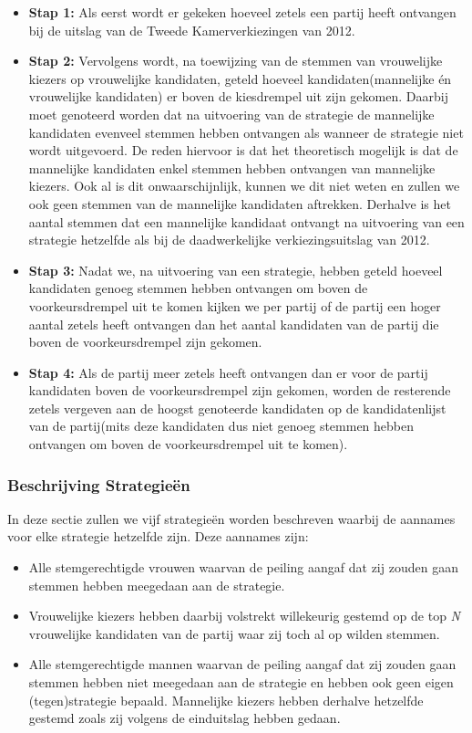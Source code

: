 \begin{itemize}
	\item
\textbf{Stap 1:} Als eerst wordt er gekeken hoeveel zetels een partij heeft ontvangen bij de uitslag van de Tweede Kamerverkiezingen van 2012. 
	\item
\textbf{Stap 2:} Vervolgens wordt, na toewijzing van de stemmen van vrouwelijke kiezers op vrouwelijke kandidaten, geteld hoeveel kandidaten(mannelijke én vrouwelijke kandidaten) er boven de kiesdrempel uit zijn gekomen. Daarbij moet genoteerd worden dat na uitvoering van de strategie de mannelijke kandidaten evenveel stemmen hebben ontvangen als wanneer de strategie niet wordt uitgevoerd. De reden hiervoor is dat het theoretisch mogelijk is dat de mannelijke kandidaten enkel stemmen hebben ontvangen van mannelijke kiezers. Ook al is dit onwaarschijnlijk, kunnen we dit niet weten en zullen we ook geen stemmen van de mannelijke kandidaten aftrekken. Derhalve is het aantal stemmen dat een mannelijke kandidaat ontvangt na uitvoering van een strategie hetzelfde als bij de daadwerkelijke verkiezingsuitslag van 2012.
	\item
\textbf{Stap 3:} Nadat we, na uitvoering van een strategie, hebben geteld hoeveel kandidaten genoeg stemmen hebben ontvangen om boven de voorkeursdrempel uit te komen kijken we per partij of de partij een hoger aantal zetels heeft ontvangen dan het aantal kandidaten van de partij die boven de voorkeursdrempel zijn gekomen. 
	\item
\textbf{Stap 4:} Als de partij meer zetels heeft ontvangen dan er voor de partij kandidaten boven de voorkeursdrempel zijn gekomen, worden de resterende zetels vergeven aan de hoogst genoteerde kandidaten op de kandidatenlijst van de partij(mits deze kandidaten dus niet genoeg stemmen hebben ontvangen om boven de voorkeursdrempel uit te komen).
\end{itemize}


\subsubsection*{Beschrijving Strategie\"{e}n} \label{besS}
In deze sectie zullen we vijf strategie\"{e}n worden beschreven waarbij de aannames voor elke strategie hetzelfde zijn. Deze aannames zijn:

\begin{itemize}
	\item 
Alle stemgerechtigde vrouwen waarvan de peiling aangaf dat zij zouden gaan stemmen hebben meegedaan aan de strategie.
	\item
Vrouwelijke kiezers hebben daarbij volstrekt willekeurig gestemd op de top \textit{N} vrouwelijke kandidaten van de partij waar zij toch al op wilden stemmen.	
	\item
Alle stemgerechtigde mannen waarvan de peiling aangaf dat zij zouden gaan stemmen hebben niet meegedaan aan de strategie en hebben ook geen eigen (tegen)strategie bepaald. Mannelijke kiezers hebben derhalve hetzelfde gestemd zoals zij volgens de einduitslag hebben gedaan. 
\end{itemize}


